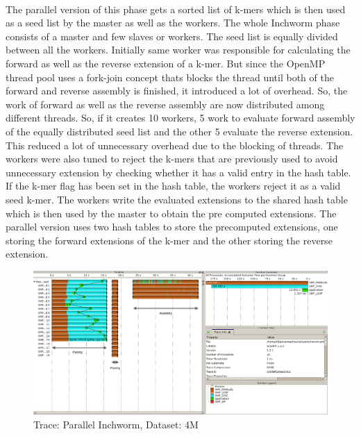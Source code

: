 \label{key}\documentclass[bachinf, english ,zihtitle,final,hyperref,utf8]{zihpub}
\begin{document}
\paragraph{}
The parallel version of this phase gets a sorted list of k-mers which is then used as a seed list by the master as well as the workers. The whole Inchworm phase consists of a master and few slaves or workers. The seed list is equally divided between all the workers. Initially same worker was responsible for calculating the forward as well as the reverse extension of a k-mer. But since the OpenMP thread pool uses a fork-join concept thats blocks the thread until both of the forward and reverse assembly is finished, it introduced a lot of overhead. So, the work of forward as well as the reverse assembly are now distributed among different threads. So, if it creates 10 workers, 5 work to evaluate forward assembly of the equally distributed seed list and the other 5 evaluate the reverse extension. This reduced a lot of unnecessary overhead due to the blocking of threads. The workers were also tuned to reject the k-mers that are previously used to avoid unnecessary extension by checking whether it has a valid entry in the hash table. If the k-mer flag has been set in the hash table, the workers reject it as a valid seed k-mer. The workers write the evaluated extensions to the shared hash table which is then used by the master to obtain the pre computed extensions. The parallel version uses two hash tables to store the precomputed extensions, one storing the forward extensions of the k-mer and the other storing the reverse extension.
\begin{figure}[h]
\center
\includegraphics[scale=0.27]{trace_parallel_Inchworm}
\caption{Trace: Parallel Inchworm, Dataset: 4M}
\label{assemble-trace}
\end{figure}
\end{document}
